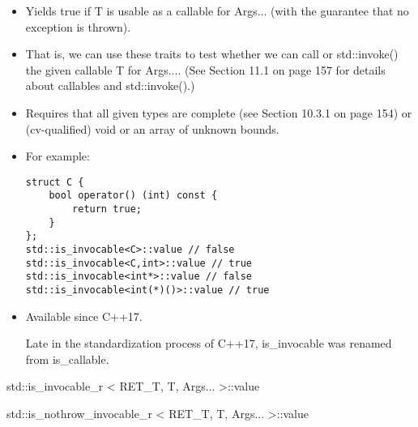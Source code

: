 \begin{itemize}
\item 
Yields true if T is usable as a callable for Args... (with the guarantee that no exception is thrown).

\item 
That is, we can use these traits to test whether we can call or std::invoke() the given callable T for Args.... (See Section 11.1 on page 157 for details about callables and std::invoke().)

\item 
Requires that all given types are complete (see Section 10.3.1 on page 154) or (cv-qualified) void or an array of unknown bounds.

\item 
For example:
\begin{lstlisting}[style=styleCXX]
struct C {
	bool operator() (int) const {
		return true;
	}
};
std::is_invocable<C>::value // false
std::is_invocable<C,int>::value // true
std::is_invocable<int*>::value // false
std::is_invocable<int(*)()>::value // true
\end{lstlisting}

\item 
Available since C++17.

\begin{tcolorbox}[colback=webgreen!5!white,colframe=webgreen!75!black]
\hspace*{0.75cm}Late in the standardization process of C++17, is\_invocable was renamed from is\_callable.
\end{tcolorbox}
\end{itemize}

std::is\_invocable\_r < RET\_T, T, Args... >::value

std::is\_nothrow\_invocable\_r < RET\_T, T, Args... >::value

